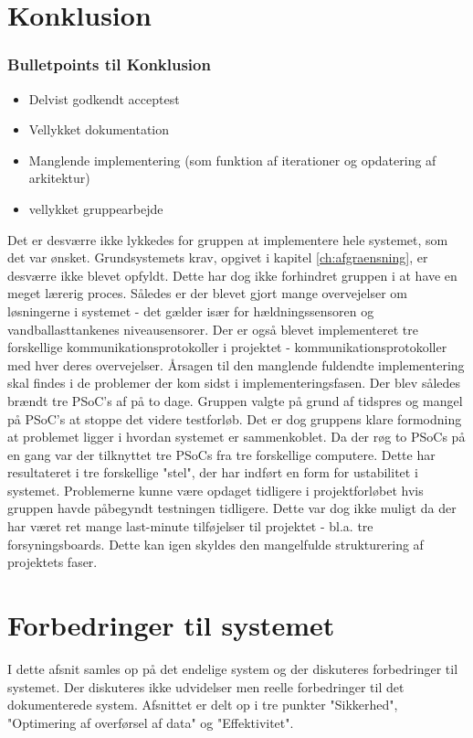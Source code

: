 \chapter{Konklusion}
\subsection{Bulletpoints til Konklusion}
\begin{itemize}
\item Delvist godkendt acceptest
\item Vellykket dokumentation
\item Manglende implementering (som funktion af iterationer og opdatering af arkitektur)
\item vellykket gruppearbejde
\end{itemize}

Det er desværre ikke lykkedes for gruppen at implementere hele systemet, som det var ønsket. Grundsystemets krav, opgivet i kapitel \ref{ch:afgraensning}, er desværre ikke blevet opfyldt. Dette har dog ikke forhindret gruppen i at have en meget lærerig proces. Således er der blevet gjort mange overvejelser om løsningerne i systemet - det gælder især for hældningssensoren og vandballasttankenes niveausensorer.
Der er også blevet implementeret tre forskellige kommunikationsprotokoller i projektet - kommunikationsprotokoller med hver deres overvejelser. Årsagen til den manglende fuldendte implementering skal findes i de problemer der kom sidst i implementeringsfasen. Der blev således brændt tre PSoC's af på to dage. Gruppen valgte på grund af tidspres og mangel på PSoC's at stoppe det videre testforløb. Det er dog gruppens klare formodning at problemet ligger i hvordan systemet er sammenkoblet. Da der røg to PSoCs på en gang var der tilknyttet tre PSoCs fra tre forskellige computere. Dette har resultateret i tre forskellige "stel", der har indført en form for ustabilitet i systemet.
Problemerne kunne være opdaget tidligere i projektforløbet hvis gruppen havde påbegyndt testningen tidligere. Dette var dog ikke muligt da der har været ret mange last-minute tilføjelser til projektet - bl.a. tre forsyningsboards. Dette kan igen skyldes den mangelfulde strukturering af projektets faser.

\chapter{Forbedringer til systemet}

I dette afsnit samles op på det endelige system og der diskuteres forbedringer til systemet. Der diskuteres ikke udvidelser men reelle forbedringer til det dokumenterede system. Afsnittet er delt op i tre punkter "Sikkerhed", "Optimering af overførsel af data" og "Effektivitet".


